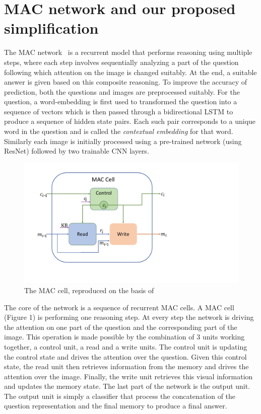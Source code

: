 \section{MAC network and our proposed simplification}

The MAC network~\cite{hudson2018compositional} is a recurrent model that performs reasoning 
using multiple steps, where each step involves sequentially analyzing a part of the question following which attention on the image is changed suitably.
At the end, a suitable answer is given based on this composite reasoning.
To improve the accuracy of prediction, both the questions and images
are preprocessed suitably. For the question,  a word-embedding is first used to
transformed the question into a sequence of vectors which is then passed through
a bidirectional LSTM to produce a sequence of hidden state pairs. Each such pair 
corresponds to a unique word in the question and is called the 
\emph{contextual embedding} for that word.
Similarly each image is initially processed using a pre-trained network (using ResNet) followed by two trainable CNN layers.


\begin{figure}
	\vspace{-15pt}
	\centering
	\includegraphics[width=\textwidth]{img/mac_cell.pdf}
	\caption{The MAC cell, reproduced on the basis of~\cite{hudson2018compositional}}
	\label{fig:mac_cell}
	\vspace{-5pt}
\end{figure}
	
The core of the network is a sequence of recurrent MAC cells. A MAC cell (Figure 1) is performing one reasoning step. At every step the network is driving the attention on one part of the question and the corresponding part of the image. This operation is made possible by the combination of 3 units working together, a control unit, a read and a write units. The control unit is updating the control state and drives the attention over the question. Given this control state, the read unit then retrieves information from the memory and drives the attention over the image.
Finally, the write unit retrieves this visual information and updates the memory state.
The last part of the network is the output unit. The output unit is simply a classifier that process the concatenation of the question representation and the final memory to produce a final answer.

